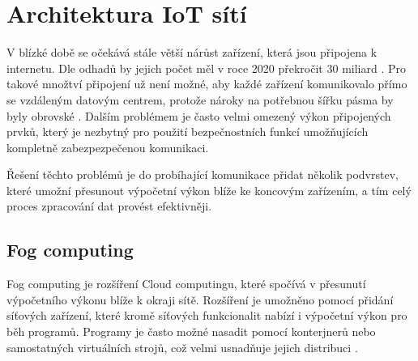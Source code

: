 \section{Architektura IoT sítí}
  V blízké době se očekává stále větší nárůst zařízení, která jsou připojena k internetu.
  Dle odhadů by jejich počet měl v roce 2020 překročit 30 miliard \cite{iotDevices}.
  Pro takové množtví připojení už není možné, aby každé zařízení komunikovalo přímo
  se vzdáleným datovým centrem, protože nároky na potřebnou šířku pásma by byly 
  obrovské \cite{fog}.
  Dalším problémem je často velmi omezený výkon připojených prvků, který je nezbytný pro 
  použití bezpečnostních funkcí umožňujících kompletně zabezpezpečenou komunikaci. 
  
  Řešení těchto problémů je do probíhající komunikace přidat několik podvrstev, 
  které umožní přesunout výpočetní výkon blíže ke koncovým zařízením, a tím celý
  proces zpracování dat provést efektivněji.
 \subsection{Fog computing} 
 Fog computing je rozšíření Cloud computingu, které spočívá v přesunutí výpočetního
 výkonu blíže k okraji sítě. Rozšíření je umožněno pomocí přidání síťových zařízení,
 které kromě síťových funkcionalit nabízí i výpočetní výkon pro běh programů. Programy 
 je často možné nasadit pomocí konterjnerů nebo samostatných virtuálních strojů, což 
 velmi usnadňuje jejich distribuci \cite{fog}.
 
